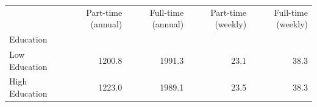\begin{tabular}{lrrrr}
\toprule
 & Part-time (annual) & Full-time (annual) & Part-time (weekly) & Full-time (weekly) \\
Education &  &  &  &  \\
\midrule
Low Education & 1200.8 & 1991.3 & 23.1 & 38.3 \\
High Education & 1223.0 & 1989.1 & 23.5 & 38.3 \\
\bottomrule
\end{tabular}
